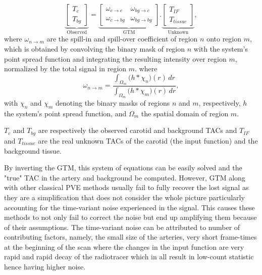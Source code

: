 \begin{equation}
	\underbrace{
		\begin{bmatrix}
			T_{c} \\
			T_{bg}
		\end{bmatrix}
	}_{\text{Observed}}
	=
	\underbrace{
		\begin{bmatrix}
			\omega_{c \rightarrow c}& \omega_{bg \rightarrow c}  \\  
			\omega_{c \rightarrow bg} & \omega_{bg \rightarrow bg}
		\end{bmatrix}
	}_{\text{GTM}}
	.
	\underbrace{
		\begin{bmatrix}
			T_{IF} \\
			T_{tissue}
		\end{bmatrix}
	}_{\text{Unknown}},
\end{equation}
where $\omega_{n \rightarrow m}$ are the spill-in and spill-over coefficient of region $n$ onto region $m$, which is obtained by convolving the binary mask of region $n$ with the system's point spread function and integrating the resulting intensity over region $m$, normalized by the total signal in region $m$.
where
\begin{equation}
	\omega_{n\to m} = \frac{\displaystyle \int_{\Omega_m} \bigl( h \ast \chi_n \bigr)(r)\,dr}{\displaystyle \int_{\Omega_m} \bigl( h \ast \chi_m \bigr)(r)\,dr},
\end{equation}
with \(\chi_n\) and \(\chi_m\) denoting the binary masks of regions \(n\) and \(m\), respectively, \(h\) the system's point spread function, and \(\Omega_m\) the spatial domain of region \(m\).

$T_{c}$ and $T_{bg}$ are respectively the observed carotid and background TACs and $T_{IF}$ and $T_{tissue}$ are the real unknown TACs of the carotid (the input function) and the background tissue.

By inverting the GTM, this system of equations can be easily solved and the "true" TAC in the artery and background be computed.
However, GTM along with other classical PVE methods usually fail to fully recover the lost signal as they are a simplification that does not consider the whole picture particularly accounting for the time-variant noise experienced in the signal.
This causes these methods to not only fail to correct the noise but end up amplifying them because of their assumptions.
The time-variant noise can be attributed to number of contributing factors, namely, the small size of the arteries, very short frame-times at the beginning of the scan where the changes in the input function are very rapid and rapid decay of the radiotracer which in all result in low-count statistic hence having higher noise.



